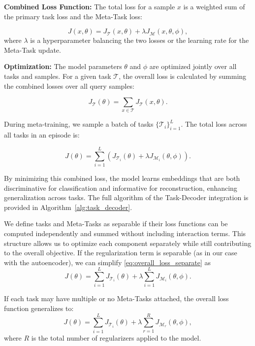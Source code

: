 \noindent
\textbf{Combined Loss Function:} The total loss for a sample \( x \) is a weighted sum of the primary task loss and the Meta-Task loss:

\begin{equation}
J(x, \theta) = J_{\mathcal{T}}(x, \theta) + \lambda J_{\mathcal{M}}(x, \theta, \phi),
\end{equation}
where \( \lambda \) is a hyperparameter balancing the two losses or the learning rate for the Meta-Task update.

\noindent
\textbf{Optimization:} The model parameters \( \theta \) and \( \phi \) are optimized jointly over all tasks and samples. For a given task $\mathcal{T}$, the overall loss is calculated by summing the combined losses over all query samples:

\begin{equation}\label{eq:task_loss}
J_{\mathcal{T}}(\theta) = \sum_{x \in \mathcal{T}} J_{\mathcal{T}}(x, \theta). 
\end{equation}

During meta-training, we sample a batch of tasks $\{\mathcal{T}_i\}^L_{i=1}$. The total loss across all tasks in an episode is:

\begin{equation}\label{eq:overall_loss_separate}
J(\theta) = \sum_{i=1}^{L} \left(J_{\mathcal{T}_i}(\theta) + \lambda J_{{\mathcal{M}_i}}(\theta, \phi)\right).
\end{equation}

By minimizing this combined loss, the model learns embeddings that are both discriminative for classification and informative for reconstruction, enhancing generalization across tasks. The full algorithm of the Task-Decoder integration is provided in Algorithm~\ref{alg:task_decoder}.

We define tasks and Meta-Tasks as separable if their loss functions can be computed independently and summed without including interaction terms. This structure allows us to optimize each component separately while still contributing to the overall objective. If the regularization term is separable (as in our case with the autoencoder), we can simplify \eqref{eq:overall_loss_separate} as
\begin{equation}\label{eq:9}
J(\theta) = \sum_{i=1}^{L} J_{\mathcal{T}_i}(\theta) +\lambda\sum_{i=1}^{L}J_{{\mathcal{M}_i}}(\theta,\phi).
\end{equation}

If each task may have multiple or no Meta-Tasks attached, the overall loss function generalizes to:
\begin{equation}\label{eq:10}
J(\theta) = \sum_{i=1}^{L} J_{\mathcal{T}_i}(\theta) +\lambda\sum_{r=1}^{R}J_{{\mathcal{M}_r}}(\theta,\phi),
\end{equation}
where $R$ is the total number of regularizers applied to the model.

